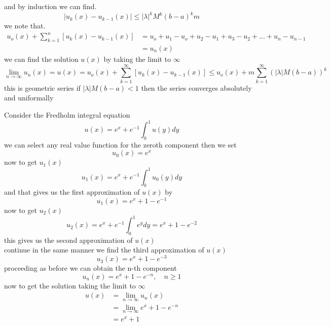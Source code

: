\documentclass[]{article}
\begin{document}
and by induction we can find.
\[
    |u_{k}(x) - u_{k-1}(x)| \leq |\lambda|^kM^k {(b-a)}^k m    
\]
we note that.
\begin{align*}
u_o(x) + \sum_{k=1}^{n} [u_{k}(x) - u_{k-1}(x)] &= u_o + u_1 - u_o + u_2 - u_1 + u_3 - u_2 + ...+u_n - u_{n-1}
\\
&= u_n(x)
\end{align*}
we can find the solution $u(x)$ by taking the limit to $\infty$
\[
    \lim_{n\to\infty} u_n(x) = u(x) = u_o(x) + \sum_{k=1}^{\infty} [u_{k}(x) - u_{k-1}(x)] \leq u_o(x) + m\sum_{k=1}^{\infty} {(|\lambda|M(b-a))}^k    
\]
this is geometric series
if $|\lambda|M(b-a) < 1$ then the series converges absolutely and uniformally
\begin{example}
    Consider the Fredholm integral equation 
    \[
        u(x) = e^x + e^{-1}\int_{0}^{1}u(y)dy    
    \]
    we can select any real value function for the zeroth component then we set 
    \[
    u_0(x) = e^x 
    \]
    now to get $u_1(x)$
    \[
        u_1(x) = e^x + e^{-1}\int_{0}^{1}u_0(y)dy        
    \]
    and that gives us the first approximation of $u(x)$ by
    \[
        u_1(x) = e^x + 1 - e^{-1} 
    \]
    now to get $u_2(x)$
    \[
        u_2(x) = e^x + e^{-1}\int_{0}^{1}e^ydy = e^x + 1 - e^{-2}
    \]
    this gives us the second approximation of $u(x)$
    \\
    continue in the same manner we find the third approximation of $u(x)$
    \[
        u_3(x) = e^x + 1 - e^{-3}
    \]
    proceeding as before we can obtain the n-th component
    \[
        u_n(x) = e^x + 1 - e^{-n} , \quad n \geq 1
    \]
    now to get the solution taking the limit to $\infty$
    \begin{align*}
        u(x) &= \lim_{n\to\infty} u_n(x)
        \\
        &= \lim_{n\to\infty} e^x + 1 - e^{-n}
        \\
        &= e^x + 1
    \end{align*}
\end{example}
\end{document}
